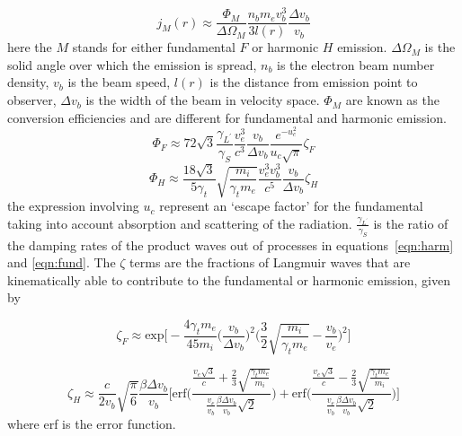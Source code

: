 \begin{equation}
j_M(r) \approx \frac{\Phi_M}{\Delta\Omega_M}\frac{n_b m_e v_b^3}{3l(r)}\frac{\Delta v_b}{v_b}
\end{equation}
here the $M$ stands for either fundamental $F$ or harmonic $H$ emission. $\Delta\Omega_M$ is the solid angle over which the  emission is spread, $n_b$ is the electron beam number density, $v_b$ is the beam speed, $l(r)$ is the distance from emission point to observer, $\Delta v_b$ is the width of the beam in velocity space. $\Phi_M$ are known as the conversion efficiencies and are different for fundamental and harmonic emission.
\begin{equation}
\Phi_F \approx 72\sqrt{3}   \frac{\gamma_{L^{'}}}{\gamma_S}   \frac{v_e^3}{c^3}   \frac{v_b}{\Delta v_b}   \frac{e^{-u_c^2}}{u_c\sqrt{\pi}}  \zeta_F
\end{equation}
\begin{equation}
\Phi_H \approx \frac{18\sqrt{3}}{5\gamma_t}   \sqrt{\frac{m_i}{\gamma_t m_e}}  \frac{v_e^3 v_b^3}{c^5} \frac{v_b}{\Delta v_b}\zeta_H
\end{equation}
the expression involving $u_c$ represent an \textquoteleft escape factor' for the fundamental taking into account absorption and scattering of the radiation. $ \frac{\gamma_{L^{'}}}{\gamma_S} $ is the ratio of the damping rates of the product waves out of processes in equations~\ref{eqn:harm} and \ref{eqn:fund}. The $\zeta$ terms are the fractions of Langmuir waves that are kinematically able to contribute to the fundamental or harmonic emission, given by

\begin{equation}
\zeta_F  \approx \mathrm{exp} \bigg[  -\frac{4\gamma_t m_e}{45 m_i}    \bigg(\frac{v_b}{\Delta v_b}\bigg)^2   \bigg(  \frac{3}{2}  \sqrt{\frac{m_i}{\gamma_t m_e}} - \frac{v_b}{v_e}  \bigg)^2    \bigg]
\end{equation}

\begin{equation}
\zeta_H \approx \frac{c}{2v_b} \sqrt{\frac{\pi}{6}} \frac{\beta \Delta v_b}{v_b}
\Bigg[  \mathrm{erf}\Bigg(     \frac{ \frac{v_e\sqrt{3}}{c}  + \frac{2}{3} \sqrt{\frac{\gamma_t m_e}{m_i}}  }  {\frac{v_e}{v_b} \frac{\beta \Delta v_b}{v_b} \sqrt{2} }   \Bigg)     +   \mathrm{erf}\Bigg(     \frac{ \frac{v_e\sqrt{3}}{c}  - \frac{2}{3} \sqrt{\frac{\gamma_t m_e}{m_i}}  }  {\frac{v_e}{v_b} \frac{\beta \Delta v_b}{v_b} \sqrt{2} }   \Bigg)   \Bigg]
\end{equation}
where erf is the error function. 

